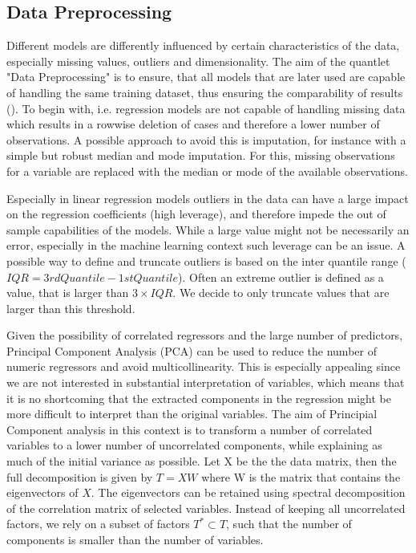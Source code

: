 \subsection{Data Preprocessing}\label{sec:data_theory}

Different models are differently influenced by certain characteristics of the data, especially missing values, outliers and dimensionality.  The aim of the quantlet "Data Preprocessing" is to ensure, that all models that are later used are capable of handling the same training dataset, thus ensuring the comparability of results (\cite{friedman_elements_2001}). 
To begin with, i.e. regression models are not capable of handling missing data which results in a rowwise deletion of cases and therefore a lower number of observations. A possible approach to avoid this is  imputation, for instance with a simple but robust median and mode imputation. For this, missing observations for a variable are replaced with the median or mode of the available observations.

Especially in linear regression models outliers in the data can have a large impact on the regression coefficients (high leverage), and therefore impede the out of sample capabilities of the  models. While a large value might not be necessarily an error, especially in the machine learning context such leverage can be an issue. A possible way to define and truncate outliers is based on the inter quantile range ($IQR = 3rd Quantile -1st Quantile$).
Often an extreme outlier is defined as a value, that is larger than $3 \times IQR$. We decide to only truncate values that are larger than this threshold. 

Given the possibility of correlated regressors and the large number of predictors, Principal Component Analysis (PCA) can be used to reduce the number of numeric regressors and avoid multicollinearity. This is especially appealing since we are not interested in substantial interpretation of variables, which means that it is no shortcoming that the extracted components in the regression might be more difficult to interpret than the original variables. 
The aim of Principial Component analysis in this context is to transform a number of correlated variables to a lower number of uncorrelated components, while explaining as much of the initial variance as possible. 
Let X be the the data matrix, then the full decomposition is given by   $  T = XW $
where W is the matrix that contains the eigenvectors of $X$.  
The eigenvectors can be retained using spectral decomposition of the correlation matrix of selected variables.
Instead of keeping all uncorrelated factors, we rely on a subset of factors $T^* \subset T$, such that the number of components is smaller than the number of variables.
 

